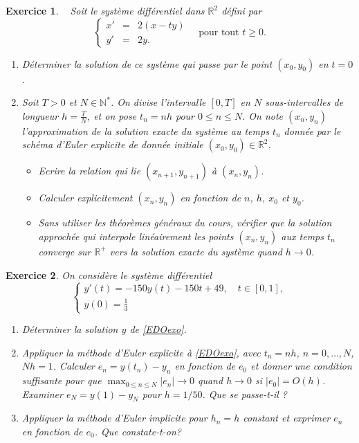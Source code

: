 \documentclass[11pt]{article}
\newcommand{\R}{\ensuremath{\mathbb R}}
\newcommand{\N}{\ensuremath{\mathbb N}}
\theoremstyle{exostyle}
\newtheorem{exercice}{Exercice}
\begin{document}
\begin{exercice}~{\bf  }
Soit le système différentiel dans $\R^2$ défini par
$$\left\{
\begin{array}{rcl}
x' &=& 2(x-ty)\\
y'&=& 2y.
\end{array}
\right. \quad \text{pour tout }  t\geq 0.$$
\begin{enumerate}
\item Déterminer la solution de ce système qui passe par le point $(x_0,y_0)$ en $t=0$.
\item
Soit $T>0$ et $N\in \N^*$. On divise l'intervalle $[0,T]$ en $N$  sous-intervalles de longueur 
$h=\frac{T}{N}$, et on pose $t_n=n h$ pour $0\leq n\leq N$. 
        On note $(x_n,y_n)$ l'approximation  de la solution exacte du système au temps $t_n$  donnée par le schéma d'Euler explicite de donnée initiale $(x_0,y_0)\in \R^2$.
\begin{itemize}
\item[a)] Ecrire la relation qui lie $(x_{n+1},y_{n+1})$ à $(x_n,y_n)$.
\item[b)] Calculer explicitement $(x_n,y_n)$ en fonction de $n$, $h$, $x_0$ et $y_0$.
\item[c)] Sans utiliser les théorèmes généraux du cours, vérifier que la solution approchée qui interpole linéairement les points $(x_n,y_n)$ aux temps $t_n$ converge sur $\R^+$ vers la solution exacte du système quand $h \to 0$.
\end{itemize}
\end{enumerate}
\end{exercice}
\medskip
\begin{exercice}
On considère le système différentiel 
\begin{equation}
 \label{EDOexo}
 \left\{
  \begin{array}{l}
     y'(t)=  -150 y(t)-150 t +49, \quad t\in [0,1], \\
     y(0)= \frac{1}{3}
  \end{array}
\right.
\end{equation}
\begin{enumerate}
   \item Déterminer la solution $y$ de \eqref{EDOexo}.
   \item Appliquer la méthode d'Euler explicite à  \eqref{EDOexo}, avec $t_n =nh$, $n=0,\dots, N$, $Nh=1$.
   Calculer $e_n=y(t_n)-y_n$ en fonction de $e_0$ et donner une condition suffisante pour que 
   $\max_{0\leq n \leq N}  |e_n| \to 0$ quand $h\to 0$ si $|e_0|=O(h)$. \newline
  Examiner $e_N =y(1)-y_N$ pour $h=1/50$. Que se passe-t-il ?
   \item Appliquer la méthode d'Euler implicite pour $h_n=h$ constant et exprimer $e_n$ en fonction de $e_0$. Que constate-t-on?
\end{enumerate}
\end{exercice}
\medskip
\end{document}
